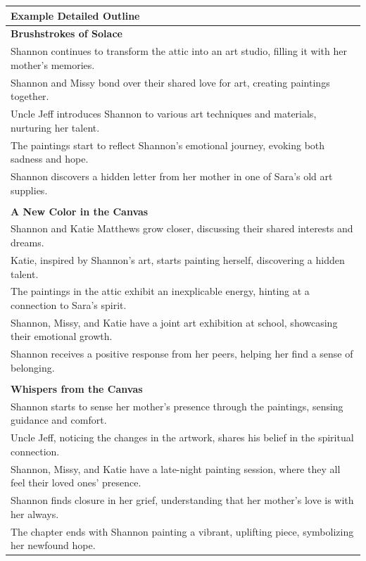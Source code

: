 \begin{small}
\onecolumn
\begin{longtable}{p{}}
\toprule
\textbf{Example Detailed Outline}\\
\midrule
\textbf{Brushstrokes of Solace}\\
Shannon continues to transform the attic into an art studio, filling it with her mother's memories.\\
Shannon and Missy bond over their shared love for art, creating paintings together.\\
Uncle Jeff introduces Shannon to various art techniques and materials, nurturing her talent.\\
The paintings start to reflect Shannon's emotional journey, evoking both sadness and hope.\\
Shannon discovers a hidden letter from her mother in one of Sara's old art supplies.\\
\\
\textbf{A New Color in the Canvas}\\
Shannon and Katie Matthews grow closer, discussing their shared interests and dreams.\\
Katie, inspired by Shannon's art, starts painting herself, discovering a hidden talent.\\
The paintings in the attic exhibit an inexplicable energy, hinting at a connection to Sara's spirit.\\
Shannon, Missy, and Katie have a joint art exhibition at school, showcasing their emotional growth.\\
Shannon receives a positive response from her peers, helping her find a sense of belonging.\\
\\
\textbf{Whispers from the Canvas}\\
Shannon starts to sense her mother's presence through the paintings, sensing guidance and comfort.\\
Uncle Jeff, noticing the changes in the artwork, shares his belief in the spiritual connection.\\
Shannon, Missy, and Katie have a late-night painting session, where they all feel their loved ones' presence.\\
Shannon finds closure in her grief, understanding that her mother's love is with her always.\\
The chapter ends with Shannon painting a vibrant, uplifting piece, symbolizing her newfound hope.\\

\end{longtable}
\end{small}
